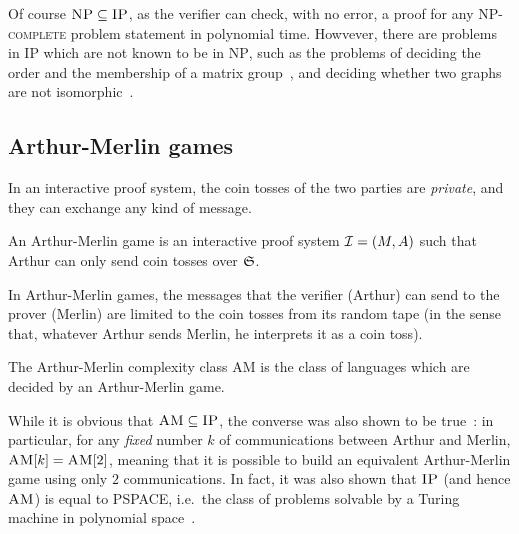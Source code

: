 Of course \(\textsc{NP} \subseteq \textsc{IP}\), as the verifier can check, with no error, a 
proof for any \textsc{NP-complete} problem statement in polynomial time.
Howvever, there are problems in \textsc{IP} which are not known to be in \textsc{NP}, such as 
the problems of deciding the order and the membership of a matrix group~\cite{BabaiS1984}, and 
deciding whether two graphs are not isomorphic~\cite{GoldreichMW1991}.

\subsection{Arthur-Merlin games}
In an interactive proof system, the coin tosses of the two parties are \emph{private}, and 
they can exchange any kind of message.
\begin{definition}
  An Arthur-Merlin game is an interactive proof system \(\mathcal{I} = \left(M, A\right)\) such that
  Arthur can only send coin tosses over \(\mathfrak{\mathfrak{S}}\).
\end{definition}

In Arthur-Merlin games, the messages that the verifier (Arthur) can send to the prover (Merlin) are 
limited to the coin tosses from its random tape (in the sense that, whatever Arthur sends Merlin, 
he interprets it as a coin toss).

\begin{definition}
  The Arthur-Merlin complexity class \textsc{AM} is the class of languages which are decided by an
  Arthur-Merlin game.
\end{definition}

While it is obvious that \(\textsc{AM} \subseteq \textsc{IP}\), the converse was also shown to 
be true~\cite{BabaiS1984}: in particular, for any \emph{fixed} number \(k\) of communications 
between Arthur and Merlin, \(\extend{\textsc{AM}}{k} = \extend{\textsc{AM}}{2}\), meaning that 
it is possible to build an equivalent Arthur-Merlin game using only \(2\) communications.
In fact, it was also shown that \(\textsc{IP}\) (and hence \(\textsc{AM}\)) is equal to 
\textsc{PSPACE}, i.e.\ the class of problems solvable by a Turing machine in polynomial 
space~\cite{Shamir1992}.

